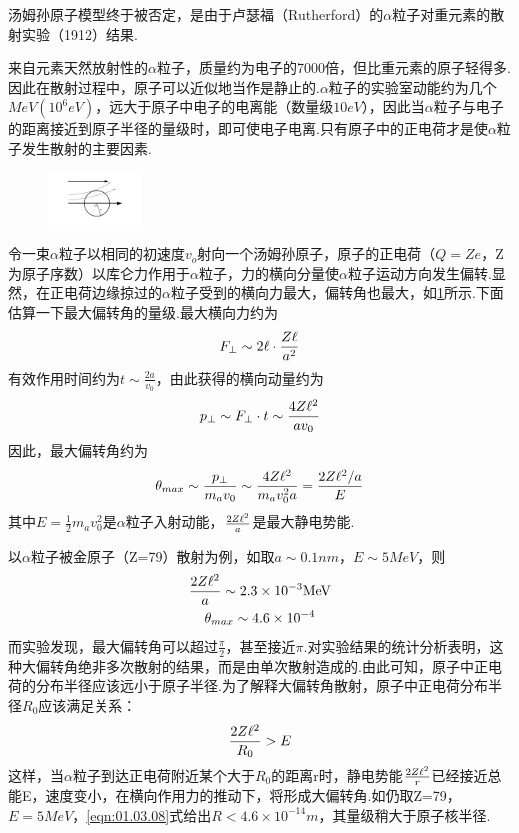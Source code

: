汤姆孙原子模型终于被否定，是由于卢瑟福（Rutherford）的$\alpha$粒子对重元素的散射实验（1912）结果.

来自元素天然放射性的$\alpha$粒子，质量约为电子的7000倍，但比重元素的原子轻得多.因此在散射过程中，原子可以近似地当作是静止的.$\alpha$粒子的实验室动能约为几个$\si{MeV(10^{6} \si{eV})}$，远大于原子中电子的电离能（数量级$10\si{eV}$），因此当$\alpha$粒子与电子的距离接近到原子半径的量级时，即可使电子电离.只有原子中的正电荷才是使$\alpha$粒子发生散射的主要因素.

\begin{figure}
	\centering
	\includegraphics[width=2.5cm,clip]{QM file/figure/1-5}
	\caption{}
	\label{fig.1-5}
\end{figure}
令一束$\alpha$粒子以相同的初速度$v_{o}$射向一个汤姆孙原子，原子的正电荷（$Q=Ze$，Z为原子序数）以库仑力作用于$\alpha$粒子，力的横向分量使$\alpha$粒子运动方向发生偏转.显然，在正电荷边缘掠过的$\alpha$粒子受到的横向力最大，偏转角也最大，如\ref{fig.1-5}所示.下面估算一下最大偏转角的量级.最大横向力约为
\begin{equation*}
	F_{\perp}\sim 2\e\cdot\frac{Z\e}{a^{2}}
\end{equation*}
有效作用时间约为$t\sim\frac{2a}{v_{0}}$，由此获得的横向动量约为
\begin{equation*}
	p_{\perp}\sim F_{\perp}\cdot t \sim\frac{4Z\e^{2}}{av_{0}}
\end{equation*}
因此，最大偏转角约为
\begin{equation}\label{eqn:01.03.07}
	\theta_{max}\sim \frac{p_{\perp}}{m_{a}v_{0}}\sim\frac{4Z\e^{2}}{m_{a}v_{0}^{2}a}=\frac{2Z\e^{2}/a}{E}
\end{equation}
其中$E=\frac{1}{2}m_{a}v_{0}^{2}$是$\alpha$粒子入射动能，$\frac{2Z\e^{2}}{a}$是最大静电势能.

以$\alpha$粒子被金原子（Z=79）散射为例，如取$a\sim 0.1\si{nm}$，$E\sim 5\si{MeV}$，则
\begin{gather}
	\frac{2Z\e^{2}}{a}\sim 2.3\times10^{-3} \si{MeV} \notag \\
	\theta_{max}\sim 4.6\times10^{-4} \notag
\end{gather}
而实验发现，最大偏转角可以超过$\frac{\pi}{2}$，甚至接近$\pi$.对实验结果的统计分析表明，这种大偏转角绝非多次散射的结果，而是由单次散射造成的.由此可知，原子中正电荷的分布半径应该远小于原子半径.为了解释大偏转角散射，原子中正电荷分布半径$R_{0}$应该满足关系：
\setlength{\mathindent}{12em}
\begin{equation}\label{eqn:01.03.08}
	\frac{2Z\e^{2}}{R_{0}} > E
\end{equation}
\eqnormal
这样，当$\alpha$粒子到达正电荷附近某个大于$R_{0}$的距离r时，静电势能$\frac{2Z\e^{2}}{r}$已经接近总能E，速度变小，在横向作用力的推动下，将形成大偏转角.如仍取Z=79，$E=5\si{MeV}$，\eqref{eqn:01.03.08}式给出$R<4.6\times10^{-14}\si{m}$，其量级稍大于原子核半径.


